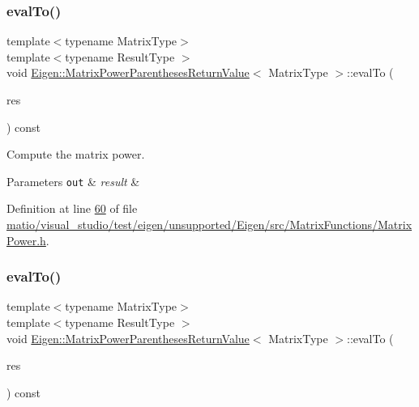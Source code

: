 \subsubsection{\texorpdfstring{eval\+To()}{evalTo()}\hspace{0.1cm}{\footnotesize\ttfamily [1/2]}}
{\footnotesize\ttfamily template$<$typename Matrix\+Type$>$ \\
template$<$typename Result\+Type $>$ \\
void \hyperlink{class_eigen_1_1_matrix_power_parentheses_return_value}{Eigen\+::\+Matrix\+Power\+Parentheses\+Return\+Value}$<$ Matrix\+Type $>$\+::eval\+To (\begin{DoxyParamCaption}\item[{Result\+Type \&}]{res }\end{DoxyParamCaption}) const\hspace{0.3cm}{\ttfamily [inline]}}



Compute the matrix power. 


\begin{DoxyParams}[1]{Parameters}
\mbox{\tt out}  & {\em result} & \\
\hline
\end{DoxyParams}


Definition at line \hyperlink{matio_2visual__studio_2test_2eigen_2unsupported_2_eigen_2src_2_matrix_functions_2_matrix_power_8h_source_l00060}{60} of file \hyperlink{matio_2visual__studio_2test_2eigen_2unsupported_2_eigen_2src_2_matrix_functions_2_matrix_power_8h_source}{matio/visual\+\_\+studio/test/eigen/unsupported/\+Eigen/src/\+Matrix\+Functions/\+Matrix\+Power.\+h}.

\mbox{\label{class_eigen_1_1_matrix_power_parentheses_return_value_a4022dd383b54272e53e52f4f7059579f}} 
\subsubsection{\texorpdfstring{eval\+To()}{evalTo()}\hspace{0.1cm}{\footnotesize\ttfamily [2/2]}}
{\footnotesize\ttfamily template$<$typename Matrix\+Type$>$ \\
template$<$typename Result\+Type $>$ \\
void \hyperlink{class_eigen_1_1_matrix_power_parentheses_return_value}{Eigen\+::\+Matrix\+Power\+Parentheses\+Return\+Value}$<$ Matrix\+Type $>$\+::eval\+To (\begin{DoxyParamCaption}\item[{Result\+Type \&}]{res }\end{DoxyParamCaption}) const\hspace{0.3cm}{\ttfamily [inline]}}



